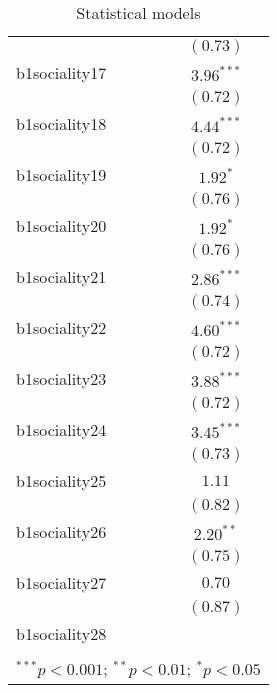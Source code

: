 \begin{table}
\begin{center}
\begin{tabular}{l c}
              & $(0.73)$      \\
b1sociality17 & $3.96^{***}$  \\
              & $(0.72)$      \\
b1sociality18 & $4.44^{***}$  \\
              & $(0.72)$      \\
b1sociality19 & $1.92^{*}$    \\
              & $(0.76)$      \\
b1sociality20 & $1.92^{*}$    \\
              & $(0.76)$      \\
b1sociality21 & $2.86^{***}$  \\
              & $(0.74)$      \\
b1sociality22 & $4.60^{***}$  \\
              & $(0.72)$      \\
b1sociality23 & $3.88^{***}$  \\
              & $(0.72)$      \\
b1sociality24 & $3.45^{***}$  \\
              & $(0.73)$      \\
b1sociality25 & $1.11$        \\
              & $(0.82)$      \\
b1sociality26 & $2.20^{**}$   \\
              & $(0.75)$      \\
b1sociality27 & $0.70$        \\
              & $(0.87)$      \\
b1sociality28 &               \\
              &               \\
\hline
\multicolumn{2}{l}{\scriptsize{$^{***}p<0.001$; $^{**}p<0.01$; $^{*}p<0.05$}}
\end{tabular}
\caption{Statistical models}
\label{table:coefficients}
\end{center}
\end{table}
